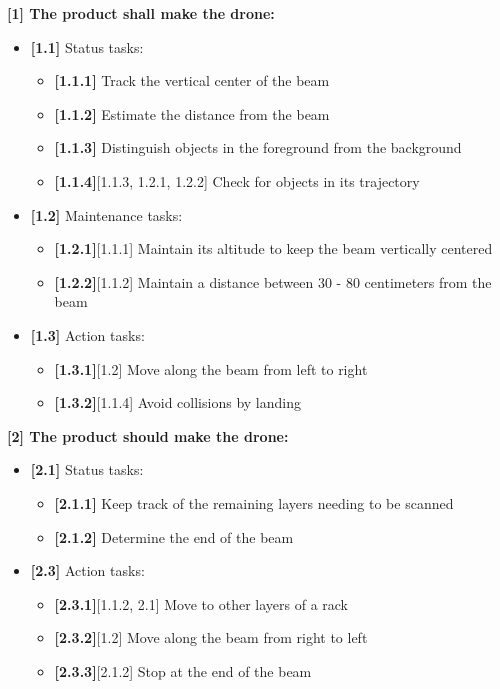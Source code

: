\textbf{[1] The product shall make the drone:}
\begin{itemize}
	\item \textbf{[1.1]} Status tasks:
	\begin{itemize}
		\item \textbf{[1.1.1]} Track the vertical center of the beam
		\item \textbf{[1.1.2]} Estimate the distance from the beam
		\item \textbf{[1.1.3]} Distinguish objects in the foreground from the background
		\item \textbf{[1.1.4]}[1.1.3, 1.2.1, 1.2.2] Check for objects in its trajectory
	\end{itemize}
	\item \textbf{[1.2]} Maintenance tasks:
	\begin{itemize}
		\item \textbf{[1.2.1]}[1.1.1] Maintain its altitude to keep the beam vertically centered
		\item \textbf{[1.2.2]}[1.1.2] Maintain a distance between 30 - 80 centimeters from the beam
	\end{itemize}
	\item \textbf{[1.3]} Action tasks:
	\begin{itemize}
		\item \textbf{[1.3.1]}[1.2] Move along the beam from left to right
		\item \textbf{[1.3.2]}[1.1.4] Avoid collisions by landing
	\end{itemize}
\end{itemize}
\noindent
\textbf{[2] The product should make the drone:}
\begin{itemize}
	\item \textbf{[2.1]} Status tasks:
	\begin{itemize}
		\item \textbf{[2.1.1]} Keep track of the remaining layers needing to be scanned
		\item \textbf{[2.1.2]} Determine the end of the beam
	\end{itemize}
	\item \textbf{[2.3]} Action tasks:
	\begin{itemize}
		\item \textbf{[2.3.1]}[1.1.2, 2.1] Move to other layers of a rack
		\item \textbf{[2.3.2]}[1.2] Move along the beam from right to left
		\item \textbf{[2.3.3]}[2.1.2] Stop at the end of the beam
	\end{itemize}
\end{itemize}
